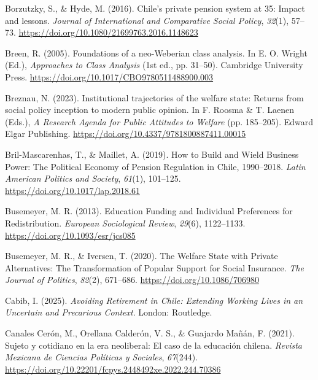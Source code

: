 \documentclass[
  12pt,
]{article}
\newlength{\cslhangindent}
\newenvironment{CSLReferences}[2] %
 {\begin{list}{}{%
  \setlength{\itemindent}{0pt}
  \setlength{\leftmargin}{0pt}
  \setlength{\parsep}{0pt}
  \ifodd #1
   \setlength{\leftmargin}{\cslhangindent}
   \setlength{\itemindent}{-1\cslhangindent}
  \fi
  \setlength{\itemsep}{#2\baselineskip}}}
 {\end{list}}
\begin{document}
\begin{CSLReferences}{1}{0}
Borzutzky, S., \& Hyde, M. (2016). Chile's private pension system at 35:
Impact and lessons. \emph{Journal of International and Comparative
Social Policy}, \emph{32}(1), 57--73.
\url{https://doi.org/10.1080/21699763.2016.1148623}

Breen, R. (2005). Foundations of a neo-{Weberian} class analysis. In E.
O. Wright (Ed.), \emph{Approaches to {Class Analysis}} (1st ed., pp.
31--50). Cambridge University Press.
\url{https://doi.org/10.1017/CBO9780511488900.003}

Breznau, N. (2023). Institutional trajectories of the welfare state:
Returns from social policy inception to modern public opinion. In F.
Roosma \& T. Laenen (Eds.), \emph{A {Research Agenda} for {Public
Attitudes} to {Welfare}} (pp. 185--205). Edward Elgar Publishing.
\url{https://doi.org/10.4337/9781800887411.00015}

Bril-Mascarenhas, T., \& Maillet, A. (2019). How to {Build} and {Wield
Business Power}: {The Political Economy} of {Pension Regulation} in
{Chile}, 1990--2018. \emph{Latin American Politics and Society},
\emph{61}(1), 101--125. \url{https://doi.org/10.1017/lap.2018.61}

Busemeyer, M. R. (2013). Education {Funding} and {Individual
Preferences} for {Redistribution}. \emph{European Sociological Review},
\emph{29}(6), 1122--1133. \url{https://doi.org/10.1093/esr/jcs085}

Busemeyer, M. R., \& Iversen, T. (2020). The {Welfare State} with
{Private Alternatives}: {The Transformation} of {Popular Support} for
{Social Insurance}. \emph{The Journal of Politics}, \emph{82}(2),
671--686. \url{https://doi.org/10.1086/706980}

Cabib, I. (2025). \emph{Avoiding {Retirement} in {Chile}: {Extending
Working Lives} in an {Uncertain} and {Precarious Context}}. London:
Routledge.

Canales Cerón, M., Orellana Calderón, V. S., \& Guajardo Mañán, F.
(2021). Sujeto y cotidiano en la era neoliberal: El caso de la educación
chilena. \emph{Revista Mexicana de Ciencias Políticas y Sociales},
\emph{67}(244).
\url{https://doi.org/10.22201/fcpys.2448492xe.2022.244.70386}


\end{CSLReferences}
\end{document}
